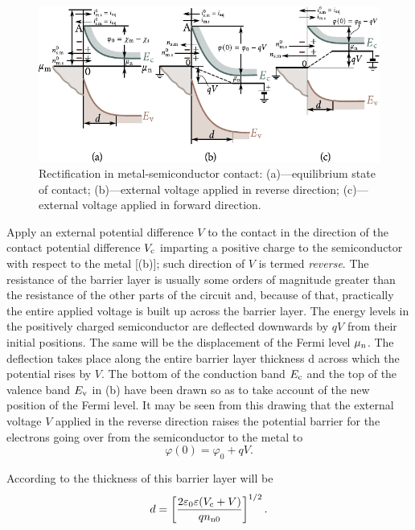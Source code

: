 \begin{figure}[t]
	\begin{center}
		\includegraphics[scale=1]{figures/ch_08/fig_8_9.pdf}
		\caption[]{Rectification in metal-semiconductor contact: (a)---equilibrium state of contact; (b)---external voltage applied in reverse direction; (c)---external voltage applied in forward direction.}
		\label{fig:8_9}
	\end{center}
	\vspace{-0.8cm}
\end{figure}

Apply an external potential difference $V$ to the contact in the direction of the contact potential difference $V_{\text{c}}$ imparting a positive charge to the semiconductor with respect to the metal [(b)]; such direction of $V$ is termed \textit{reverse}. The resistance of the barrier layer is usually some orders of magnitude greater than the resistance of the other parts of the circuit and, because of that, practically the entire applied voltage is built up across the barrier layer. The energy levels in the positively charged semiconductor are deflected downwards by $qV$ from their initial positions. The same will be the displacement of the Fermi level $\mu_{\text{n}}$. The deflection takes place along the entire barrier layer thickness d across which the potential rises by $V$. The bottom of the conduction band $E_{\text{c}}$ and the top of the valence band $E_{\text{v}}$ in (b) have been drawn so as to take account of the new position of the Fermi level. It may be seen from this drawing that the external voltage $V$ applied in the reverse direction raises the potential barrier for the electrons going over from the semiconductor to the metal to
\begin{equation}\label{eq:8_10}
    \varphi(0) = \varphi_0 + qV.
\end{equation}

\noindent
According to  the thickness of this barrier layer will be
\begin{equation}\label{eq:8_11}
    d = \left[\frac{2 \varepsilon_0 \varepsilon (V_{\text{c}} + V)}{q n_{\text{n$0$}}}\right]^{1/2}.
\end{equation}

